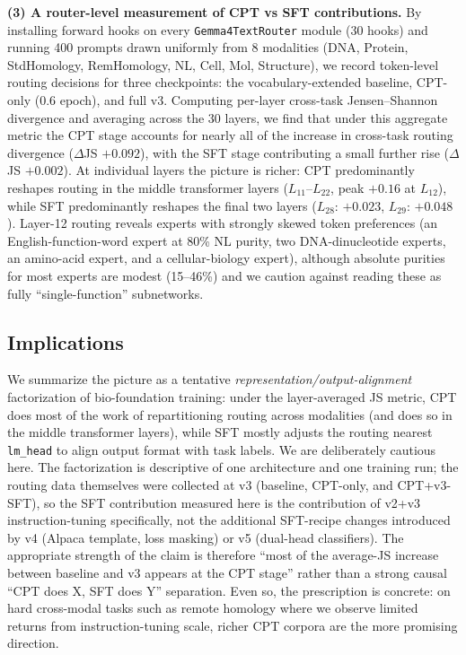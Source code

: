 \documentclass[11pt]{article}
\begin{document}
\textbf{(3) A router-level measurement of CPT vs SFT contributions.} By installing forward hooks on every \texttt{Gemma4TextRouter} module (30 hooks) and running 400 prompts drawn uniformly from 8 modalities (DNA, Protein, StdHomology, RemHomology, NL, Cell, Mol, Structure), we record token-level routing decisions for three checkpoints: the vocabulary-extended baseline, CPT-only (0.6 epoch), and full v3. Computing per-layer cross-task Jensen--Shannon divergence and averaging across the 30 layers, we find that under this aggregate metric the CPT stage accounts for nearly all of the increase in cross-task routing divergence ($\Delta$JS $+0.092$), with the SFT stage contributing a small further rise ($\Delta$JS $+0.002$). At individual layers the picture is richer: CPT predominantly reshapes routing in the middle transformer layers ($L_{11}$--$L_{22}$, peak $+0.16$ at $L_{12}$), while SFT predominantly reshapes the final two layers ($L_{28}$: $+0.023$, $L_{29}$: $+0.048$). Layer-12 routing reveals experts with strongly skewed token preferences (an English-function-word expert at 80\% NL purity, two DNA-dinucleotide experts, an amino-acid expert, and a cellular-biology expert), although absolute purities for most experts are modest (15--46\%) and we caution against reading these as fully ``single-function'' subnetworks.

\subsection*{Implications}

We summarize the picture as a tentative \emph{representation/output-alignment} factorization of bio-foundation training: under the layer-averaged JS metric, CPT does most of the work of repartitioning routing across modalities (and does so in the middle transformer layers), while SFT mostly adjusts the routing nearest \texttt{lm\_head} to align output format with task labels. We are deliberately cautious here. The factorization is descriptive of one architecture and one training run; the routing data themselves were collected at v3 (baseline, CPT-only, and CPT+v3-SFT), so the SFT contribution measured here is the contribution of v2+v3 instruction-tuning specifically, not the additional SFT-recipe changes introduced by v4 (Alpaca template, loss masking) or v5 (dual-head classifiers). The appropriate strength of the claim is therefore ``most of the average-JS increase between baseline and v3 appears at the CPT stage'' rather than a strong causal ``CPT does X, SFT does Y'' separation. Even so, the prescription is concrete: on hard cross-modal tasks such as remote homology where we observe limited returns from instruction-tuning scale, richer CPT corpora are the more promising direction.
\end{document}
